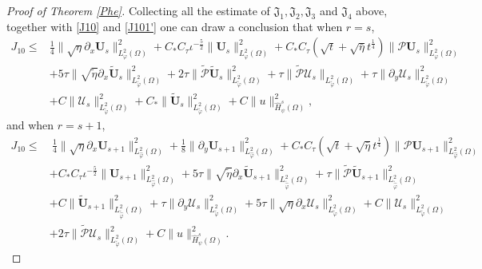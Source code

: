 \documentclass{amsart}
\numberwithin{equation}{section}
\begin{document}
\begin{proof}[Proof of Theorem \ref{Phe}]
Collecting all the estimate of $\mathfrak{J}_{1}, \mathfrak{J}_{2}, \mathfrak{J}_{3}$ and $\mathfrak{J}_{4}$ above, together with \eqref{J10} and \eqref{J101'} one can draw a conclusion that when $r=s$,
\begin{align*}
J_{10}
\leq& \frac{1}{4}\|\sqrt{\eta}\partial_{x}\mathbf{U}_{s}\|_{L_{\varphi}^{2}(\Omega)}^{2}
     +C_{*}C_{\tau}\iota^{-\frac{5}{2}}\|\mathbf{U}_{s}\|_{L_{\varphi}^{2}(\Omega)}^{2}
     +C_{*}C_{\tau}(\sqrt{t}+\sqrt{\bar{\eta}}t^{\frac{1}{4}})\|\mathcal{P}\mathbf{U}_{s}\|_{L_{\varphi}^{2}(\Omega)}^{2}\\
    &+5\tau\|\sqrt{\tilde{\eta}}\partial_{x}\tilde{\mathbf{U}}_{s}\|_{L_{\tilde{\varphi}}^{2}(\Omega)}^{2}
     +2\tau\|\tilde{\mathcal{P}}\tilde{\mathbf{U}}_{s}\|_{L_{\tilde{\varphi}}^{2}(\Omega)}^{2}
     +\tau\|\tilde{\mathcal{P}}\mathcal{U}_{s}\|_{L_{\tilde{\varphi}}^{2}(\Omega)}
     +\tau\|\partial_{y}\mathcal{U}_{s}\|_{L_{\tilde{\varphi}}^{2}(\Omega)}^{2}\\
    &+C\|\mathcal{U}_{s}\|_{L_{\tilde{\varphi}}^{2}(\Omega)}^{2}
     +C_{*}\|\tilde{\mathbf{U}}_{s}\|_{L_{\tilde{\varphi}}^{2}(\Omega)}^{2}
     +C\|u\|_{\hat{H}_{\psi}^{s}(\Omega)}^{2},
\end{align*}
and when $r=s+1$,
\begin{align*}
J_{10}
\leq&~\frac{1}{4}\|\sqrt{\eta}\partial_{x}\mathbf{U}_{s+1}\|_{L_{\hat{\varphi}}^{2}(\Omega)}^{2}
     +\frac{1}{8}\|\partial_{y}\mathbf{U}_{s+1}\|_{L_{\hat{\varphi}}^{2}(\Omega)}^{2}
     +C_{*}C_{\tau}(\sqrt{t}+\sqrt{\bar{\eta}}t^{\frac{1}{4}})\|\mathcal{P}\mathbf{U}_{s+1}\|_{L_{\hat{\varphi}}^{2}(\Omega)}^{2}\\
    &+C_{*}C_{\tau}\iota^{-\frac{5}{2}}\|\mathbf{U}_{s+1}\|_{L_{\hat{\varphi}}^{2}(\Omega)}^{2}
     +5\tau\|\sqrt{\tilde{\eta}}\partial_{x}\tilde{\mathbf{U}}_{s+1}\|_{L_{\tilde{\hat{\varphi}}}^{2}(\Omega)}^{2}
     +\tau\|\tilde{\mathcal{P}}\tilde{\mathbf{U}}_{s+1}\|_{L_{\tilde{\hat{\varphi}}}^{2}(\Omega)}^{2}\\
    &+C\|\tilde{\mathbf{U}}_{s+1}\|_{L_{\tilde{\hat{\varphi}}}^{2}(\Omega)}^{2}
     +\tau\|\partial_{y}\mathcal{U}_{s}\|_{L_{\tilde{\varphi}}^{2}(\Omega)}^{2}
     +5\tau\|\sqrt{\eta}\partial_{x}\mathcal{U}_{s}\|_{L_{\tilde{\varphi}}^{2}(\Omega)}^{2}
     +C\|\mathcal{U}_{s}\|_{L_{\tilde{\varphi}}^{2}(\Omega)}^{2}\\
    &+2\tau\|\tilde{\mathcal{P}}\mathcal{U}_{s}\|_{L_{\tilde{\varphi}}^{2}(\Omega)}^{2}
     +C\|u\|_{\hat{H}_{\psi}^{s}(\Omega)}^{2}.
\end{align*}


\end{proof}
\end{document}
